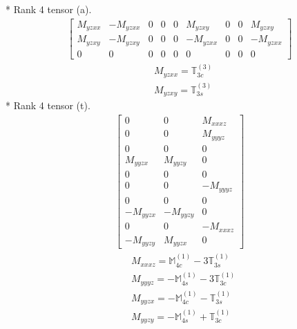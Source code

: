 \documentclass[fleqn,8pt,landscape]{jsarticle}
\begin{document}
* Rank 4 tensor (a).
\begin{align*}
\begin{bmatrix} M_{yzxx} & - M_{yzxx} & 0 & 0 & 0 & M_{yzxy} & 0 & 0 & M_{yzxy} \\ M_{yzxy} & - M_{yzxy} & 0 & 0 & 0 & - M_{yzxx} & 0 & 0 & - M_{yzxx} \\ 0 & 0 & 0 & 0 & 0 & 0 & 0 & 0 & 0 \end{bmatrix}
\end{align*}
\begin{align*}
& M_{yzxx} = \mathbb{T}_{3c}^{(3)} \\
& M_{yzxy} = \mathbb{T}_{3s}^{(3)}
\end{align*}
* Rank 4 tensor (t).
\begin{align*}
\begin{bmatrix} 0 & 0 & M_{xxxz} \\ 0 & 0 & M_{yyyz} \\ 0 & 0 & 0 \\ M_{yyzx} & M_{yyzy} & 0 \\ 0 & 0 & 0 \\ 0 & 0 & - M_{yyyz} \\ 0 & 0 & 0 \\ - M_{yyzx} & - M_{yyzy} & 0 \\ 0 & 0 & - M_{xxxz} \\ - M_{yyzy} & M_{yyzx} & 0 \end{bmatrix}
\end{align*}
\begin{align*}
& M_{xxxz} = \mathbb{M}_{4c}^{(1)} - 3 \mathbb{T}_{3s}^{(1)} \\
& M_{yyyz} = - \mathbb{M}_{4s}^{(1)} - 3 \mathbb{T}_{3c}^{(1)} \\
& M_{yyzx} = - \mathbb{M}_{4c}^{(1)} - \mathbb{T}_{3s}^{(1)} \\
& M_{yyzy} = - \mathbb{M}_{4s}^{(1)} + \mathbb{T}_{3c}^{(1)}
\end{align*}
\end{document}
